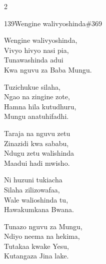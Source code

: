 \documentclass{article}
\begin{document}
\begin{multicols}{2}
\begin{hymn}{139}{Wengine walivyoshinda}{\#369}
\begin{stanza}
Wengine walivyoshinda,\\
Vivyo hivyo nasi pia,\\
Tunawashinda adui\\
Kwa nguvu za Baba Mungu.
\end{stanza}
\begin{stanza}
Tuzichukue silaha,\\
Ngao na zingine zote,\\
Hamna hila kutudhuru,\\
Mungu anatuhifadhi.
\end{stanza}
\begin{stanza}
Taraja na nguvu zetu\\
Zinazidi kwa sababu,\\
Ndugu zetu walishinda\\
Maadui hadi mwisho.
\end{stanza}
\begin{stanza}
Ni huzuni tukiacha\\
Silaha zilizowafaa,\\
Wale walioshinda tu,\\
Hawakumkana Bwana.
\end{stanza}
\begin{stanza}
Tunazo nguvu za Mungu,\\
Ndiyo neema na hekima,\\
Tutakaa kwake Yesu,\\
Kutangaza Jina lake.
\end{stanza}
\end{hymn}


\end{multicols}
\end{document}
